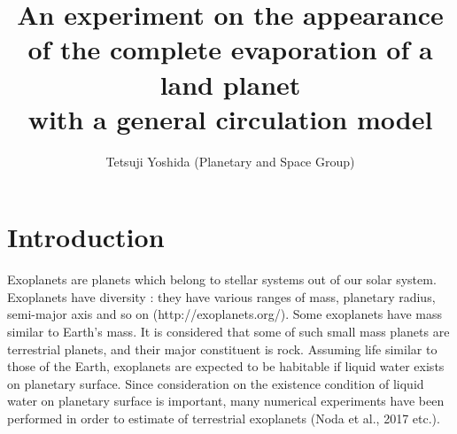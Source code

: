 \documentclass[dvipdfmx,twocolumn,10pt]{jsarticle}
\begin{document}
\pagestyle{empty}
\title{\Large An experiment on the appearance of the complete evaporation of a land planet \\ with a general circulation model}

\author{\large Tetsuji Yoshida (Planetary and Space Group)}
\date{}
\maketitle
\vspace{-0.2zh}
\section{Introduction}
\vspace{-0.5zh}
Exoplanets are planets which belong to stellar systems out of our solar system. 
Exoplanets have diversity : they have various ranges of mass, planetary radius, semi-major axis and so on (http://exoplanets.org/). 
Some exoplanets have mass similar to Earth's mass. 
It is considered that some of such small mass planets are terrestrial planets, and their major constituent is rock. 
Assuming life similar to those of the Earth, exoplanets are expected to be habitable if liquid water exists on planetary surface. 
Since consideration on the existence condition of liquid water on planetary surface is important, many numerical experiments have been performed in order to estimate of terrestrial exoplanets (Noda et al., 2017 etc.). 
\end{document}
